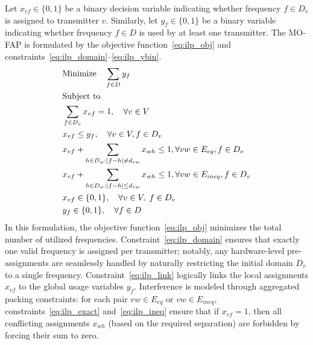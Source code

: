 \documentclass[letterpaper,journal]{IEEEtran}
\begin{document}
Let $x_{vf} \in \{0, 1\}$ be a binary decision variable indicating whether frequency $f \in D_v$ is assigned to transmitter $v$.
Similarly, let $y_f \in \{0, 1\}$ be a binary variable indicating whether frequency $f \in D$ is used by at least one transmitter.
The MO-FAP is formulated by the objective function~\eqref{eq:ilp_obj} and constraints~\eqref{eq:ilp_domain}--\eqref{eq:ilp_ybin}.
\begin{align} 
    & \text{Minimize} \quad \sum_{f \in D} y_f \label{eq:ilp_obj} \\
    & \text{Subject to} \notag \\
    & \sum_{f \in D_v} x_{vf} = 1, \quad \forall v \in V \label{eq:ilp_domain} \\
    & x_{vf} \le y_f, \quad \forall v \in V, f \in D_v \label{eq:ilp_link} \\
    & x_{vf} + \sum_{h \in D_w : |f - h| \neq d_{vw}} x_{wh} \le 1, \forall vw \in E_{eq}, f \in D_v \label{eq:ilp_exact} \\
    & x_{vf} + \sum_{h \in D_w : |f - h| \le d_{vw}} x_{wh} \le 1, \forall vw \in E_{ineq}, f \in D_v \label{eq:ilp_ineq} \\
    & x_{vf} \in \{0, 1\}, \quad \forall v \in V,\; f \in D_v \label{eq:ilp_xbin} \\
    & y_f \in \{0, 1\}, \quad \forall f \in D \label{eq:ilp_ybin}
\end{align}
In this formulation, the objective function~\eqref{eq:ilp_obj} minimizes the total number of utilized frequencies. Constraint~\eqref{eq:ilp_domain} ensures that exactly one valid frequency is assigned per transmitter; notably, any hardware-level pre-assignments are seamlessly handled by naturally restricting the initial domain $D_v$ to a single frequency. Constraint~\eqref{eq:ilp_link} logically links the local assignments $x_{vf}$ to the global usage variables $y_f$.
Interference is modeled through aggregated packing constraints: for each pair $vw \in E_{eq}$ or $vw \in E_{ineq}$, constraints~\eqref{eq:ilp_exact} and~\eqref{eq:ilp_ineq} ensure that if $x_{vf} = 1$, then all conflicting assignments $x_{wh}$ (based on the required separation) are forbidden by forcing their sum to zero.
\end{document}
